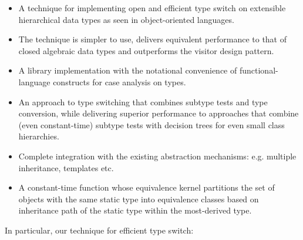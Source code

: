   \begin{itemize}
  \setlength{\itemsep}{0pt}
  \setlength{\parskip}{0pt}
  \item A technique for implementing open and efficient type 
        switch on extensible hierarchical data types as seen in 
        object-oriented languages.
  \item The technique is simpler to use, delivers equivalent performance to that 
        of closed algebraic data types and outperforms the visitor design pattern.
  \item A library implementation with the notational convenience of
        functional-language constructs for case analysis on types.
  \item An approach to type switching that combines subtype tests and type 
        conversion, while delivering superior performance to approaches that 
        combine (even constant-time) subtype tests with decision trees for even 
        small class hierarchies. 
  \item Complete integration with the existing \Cpp{} abstraction mechanisms: 
        e.g. multiple inheritance, templates etc.
  \item A constant-time function whose equivalence kernel partitions 
        the set of objects with the same static type into equivalence classes 
        based on inheritance path of the static type within the most-derived type.
  \end{itemize}

\noindent
In particular, our technique for efficient type switch:

